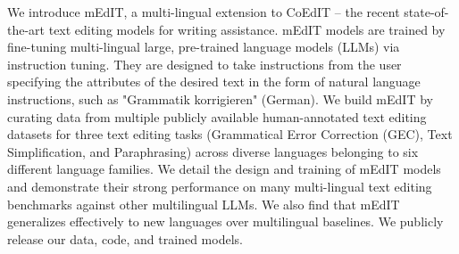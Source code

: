 We introduce mEdIT, a multi-lingual extension to CoEdIT – the recent state-of-the-art text editing models for writing assistance. mEdIT models are trained by fine-tuning multi-lingual large, pre-trained language models (LLMs) via instruction tuning. They are designed to take instructions from the user specifying the attributes of the desired text in the form of natural language instructions, such as "Grammatik korrigieren" (German). We build mEdIT by curating data from multiple publicly available human-annotated text editing datasets for three text editing tasks (Grammatical Error Correction (GEC), Text Simplification, and Paraphrasing) across diverse languages belonging to six different language families. We detail the design and training of mEdIT models and demonstrate their strong performance on many multi-lingual text editing benchmarks against other multilingual LLMs. We also find that mEdIT generalizes effectively to new languages over multilingual baselines. We publicly release our data, code, and trained models.